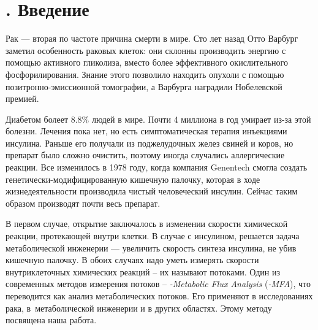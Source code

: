\documentclass[14pt, a4paper]{extreport}
\begin{document}
\chapter[Введение]{\thechapter{}. Введение}
Рак --- вторая по частоте причина смерти в мире\cite{Cancer_statistics}. Сто лет назад Отто Варбург заметил\cite{Warburg_effect} особенность раковых клеток: они склонны производить энергию с помощью активного гликолиза, вместо более эффективного окислительного фосфорилирования. Знание этого позволило находить опухоли с помощью позитронно-эмиссионной томографии, а Варбурга наградили Нобелевской премией.

Диабетом болеет 8.8\% людей в мире\cite{Diabetes_statistics}. Почти 4 миллиона в год умирает из-за этой болезни. Лечения пока нет, но есть симптоматическая терапия инъекциями инсулина. Раньше его получали из поджелудочных желез свиней и коров, но препарат было сложно очистить, поэтому иногда случались аллергические реакции. Все изменилось в 1978 году, когда компания Genentech смогла создать генетически-модифицированную кишечную палочку, которая в ходе жизнедеятельности производила чистый человеческий инсулин\cite{Genentech_paper}. Сейчас таким образом производят почти весь препарат.

В первом случае, открытие заключалось в изменении скорости химической реакции, протекающей внутри клетки. В случае с инсулином, решается задача метаболической инженерии --- увеличить скорость синтеза инсулина, не убив кишечную палочку. В обоих случаях надо уметь измерять скорости внутриклеточных химических реакций -- их называют потоками. Один из современных методов измерения потоков -- \emph{-Metabolic Flux Analysis} (\emph{-MFA}), что переводится как анализ метаболических потоков. Его применяют в исследованиях рака\cite{Application_cancer_2009, Application_cancer_2012, Application_cancer_2013, Application_cancer_2015, Application_cancer_2017, Application_cancer_2018, Application_cancer_2018_2}, в~метаболической инженерии\cite{Application_engeneering_2009, Application_engeneering_2015, Application_engeneering_2017} и в других областях\cite{Application_other_2011, Application_other_2013, Application_other_2014}. Этому методу посвящена наша работа.
\end{document}
